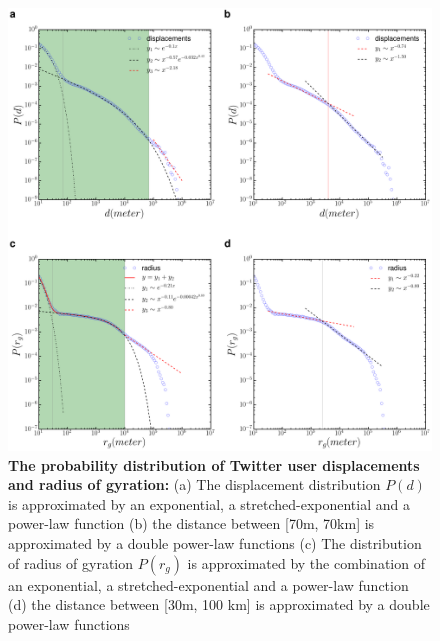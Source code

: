 \documentclass[]{tGIS2e}
\begin{document}
\begin{figure}[ht]
\includegraphics[width=1.0\linewidth]{./figure/S4_radius_displacement}
\caption{{\bf The probability distribution of Twitter user displacements and radius of gyration:} (a) The displacement distribution $P(d)$ is approximated by an exponential, a stretched-exponential and a power-law function (b) the distance between [70m, 70km] is approximated by a double power-law functions (c) The distribution of radius of gyration $P(r_g)$ is approximated by the combination of an exponential, a stretched-exponential and a power-law function (d) the distance between [30m, 100 km] is approximated by a double power-law functions}
\label{S4_Fig}
\end{figure}
\end{document}
